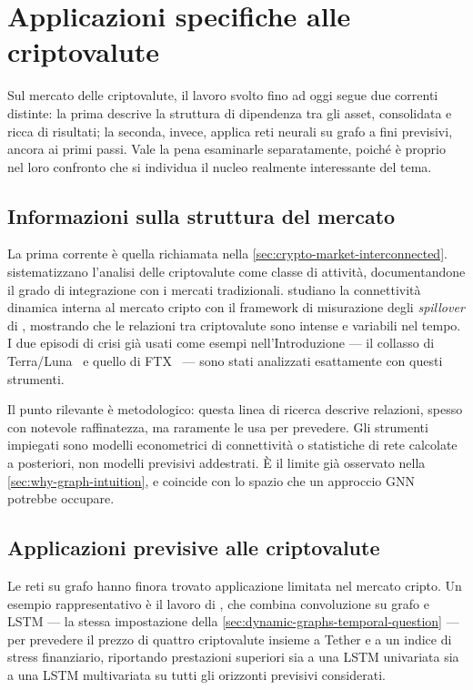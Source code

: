 \section{Applicazioni specifiche alle criptovalute}
\label{sec:applications-cryptocurrencies}

Sul mercato delle criptovalute, il lavoro svolto fino ad oggi segue due correnti distinte: la prima descrive la struttura di dipendenza tra gli asset, consolidata e ricca di risultati; la seconda, invece, applica reti neurali su grafo a fini previsivi, ancora ai primi passi. Vale la pena esaminarle separatamente, poiché è proprio nel loro confronto che si individua il nucleo realmente interessante del tema.

\subsection{Informazioni sulla struttura del mercato}

La prima corrente è quella richiamata nella \cref{sec:crypto-market-interconnected}. \Textcite{corbet2019cryptocurrencies} sistematizzano l'analisi delle criptovalute come classe di attività, documentandone il grado di integrazione con i mercati tradizionali. \Textcite{ji2019dynamic} studiano la connettività dinamica interna al mercato cripto con il framework di misurazione degli \emph{spillover} di \textcite{dieboldyilmaz2012spillover}, mostrando che le relazioni tra criptovalute sono intense e variabili nel tempo. I due episodi di crisi già usati come esempi nell'Introduzione — il collasso di Terra/Luna~\cite{briola2023anatomy} e quello di FTX~\cite{akyildirim2023understanding} — sono stati analizzati esattamente con questi strumenti.

Il punto rilevante è metodologico: questa linea di ricerca descrive relazioni, spesso con notevole raffinatezza, ma raramente le usa per prevedere. Gli strumenti impiegati sono modelli econometrici di connettività o statistiche di rete calcolate a posteriori, non modelli previsivi addestrati. È il limite già osservato nella \cref{sec:why-graph-intuition}, e coincide con lo spazio che un approccio GNN potrebbe occupare.

\subsection{Applicazioni previsive alle criptovalute}

Le reti su grafo hanno finora trovato applicazione limitata nel mercato cripto. Un esempio rappresentativo è il lavoro di \textcite{yin2024forecasting}, che combina convoluzione su grafo e LSTM — la stessa impostazione della \cref{sec:dynamic-graphs-temporal-question} — per prevedere il prezzo di quattro criptovalute insieme a Tether e a un indice di stress finanziario, riportando prestazioni superiori sia a una LSTM univariata sia a una LSTM multivariata su tutti gli orizzonti previsivi considerati.

